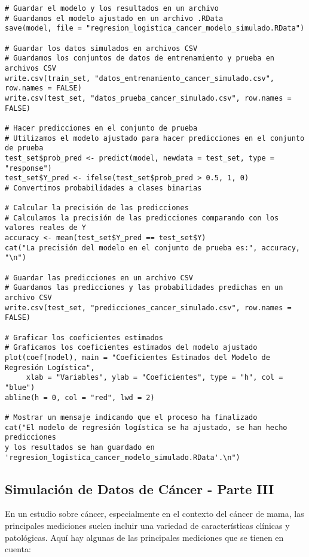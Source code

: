 \begin{verbatim}
# Guardar el modelo y los resultados en un archivo
# Guardamos el modelo ajustado en un archivo .RData
save(model, file = "regresion_logistica_cancer_modelo_simulado.RData")

# Guardar los datos simulados en archivos CSV
# Guardamos los conjuntos de datos de entrenamiento y prueba en archivos CSV
write.csv(train_set, "datos_entrenamiento_cancer_simulado.csv", row.names = FALSE)
write.csv(test_set, "datos_prueba_cancer_simulado.csv", row.names = FALSE)

# Hacer predicciones en el conjunto de prueba
# Utilizamos el modelo ajustado para hacer predicciones en el conjunto de prueba
test_set$prob_pred <- predict(model, newdata = test_set, type = "response")
test_set$Y_pred <- ifelse(test_set$prob_pred > 0.5, 1, 0)  
# Convertimos probabilidades a clases binarias

# Calcular la precisión de las predicciones
# Calculamos la precisión de las predicciones comparando con los valores reales de Y
accuracy <- mean(test_set$Y_pred == test_set$Y)
cat("La precisión del modelo en el conjunto de prueba es:", accuracy, "\n")

# Guardar las predicciones en un archivo CSV
# Guardamos las predicciones y las probabilidades predichas en un archivo CSV
write.csv(test_set, "predicciones_cancer_simulado.csv", row.names = FALSE)

# Graficar los coeficientes estimados
# Graficamos los coeficientes estimados del modelo ajustado
plot(coef(model), main = "Coeficientes Estimados del Modelo de Regresión Logística", 
     xlab = "Variables", ylab = "Coeficientes", type = "h", col = "blue")
abline(h = 0, col = "red", lwd = 2)

# Mostrar un mensaje indicando que el proceso ha finalizado
cat("El modelo de regresión logística se ha ajustado, se han hecho predicciones 
y los resultados se han guardado en 'regresion_logistica_cancer_modelo_simulado.RData'.\n")
\end{verbatim}

\subsection{Simulaci\'on de Datos de Cáncer - Parte III}

En un estudio sobre cáncer, especialmente en el contexto del cáncer de mama, las principales mediciones suelen incluir una variedad de características clínicas y patológicas. Aquí hay algunas de las principales mediciones que se tienen en cuenta:

